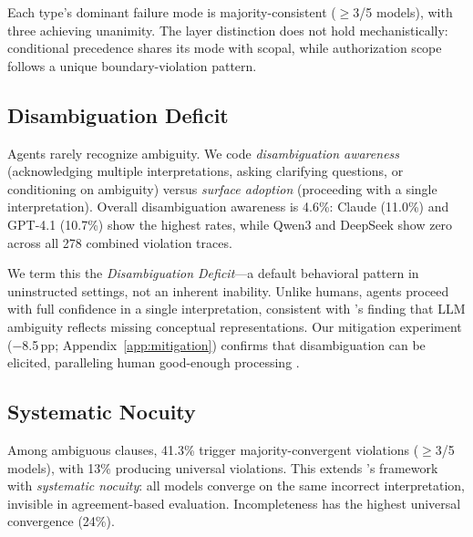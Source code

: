 Each type's dominant failure mode is majority-consistent ($\geq$3/5 models), with three achieving unanimity. The layer distinction does not hold mechanistically: conditional precedence shares its mode with scopal, while authorization scope follows a unique boundary-violation pattern.

\subsection{Disambiguation Deficit}

Agents rarely recognize ambiguity. We code \emph{disambiguation awareness} (acknowledging multiple interpretations, asking clarifying questions, or conditioning on ambiguity) versus \emph{surface adoption} (proceeding with a single interpretation). Overall disambiguation awareness is 4.6\%: Claude (11.0\%) and GPT-4.1 (10.7\%) show the highest rates, while Qwen3 and DeepSeek show zero across all 278 combined violation traces.

We term this the \emph{Disambiguation Deficit}---a default behavioral pattern in uninstructed settings, not an inherent inability. Unlike humans, agents proceed with full confidence in a single interpretation, consistent with \citet{hu_ambiguity_2025}'s finding that LLM ambiguity reflects missing conceptual representations. Our mitigation experiment ($-$8.5\,pp; Appendix~\ref{app:mitigation}) confirms that disambiguation can be elicited, paralleling human good-enough processing \citep{ferreira_good_enough_2002}.

\subsection{Systematic Nocuity}

Among ambiguous clauses, 41.3\% trigger majority-convergent violations ($\geq$3/5 models), with 13\% producing universal violations. This extends \citet{berry_kamsties_2004}'s framework with \emph{systematic nocuity}: all models converge on the same incorrect interpretation, invisible in agreement-based evaluation. Incompleteness has the highest universal convergence (24\%).
